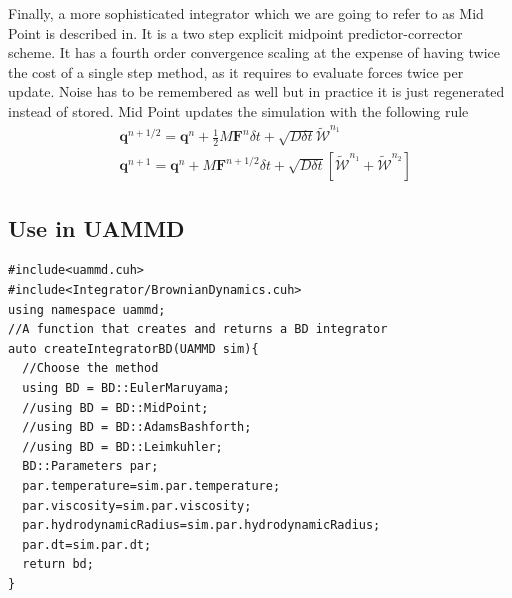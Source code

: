 \documentclass[ twoside,openright,titlepage,numbers=noenddot,%
headinclude,footinclude,cleardoublepage=empty,abstract=on,
BCOR=5mm,paper=a4,fontsize=11pt, dvipsnames
]{scrreprt}
\def\ucpp{uammd_cpp_lexer.py:UAMMDCppLexer -x}
\renewcommand{\vec}[1]{\bm{#1}}
\newcommand{\dt}{\delta t}
\newcommand{\half}{\frac{1}{2}}
\newcommand{\noise}{\widetilde{W}}
\newcommand{\ppos}{q}
\begin{document}
Finally, a more sophisticated integrator which we are going to refer to as Mid Point is described in\cite{Delong2013}. 
It is a two step explicit midpoint predictor-corrector scheme. It has a fourth order convergence scaling at the expense of having twice the cost of a single step method, as it requires to evaluate forces twice per update. Noise has to be remembered as well but in practice it is just regenerated instead of stored.
Mid Point updates the simulation with the following rule
\begin{equation}
  \begin{aligned}
    &\vec{\ppos}^{n+1/2} = \vec{\ppos}^n + \half M\vec{F}^n\dt + \sqrt{D\dt}\vec{\mathcal{\noise}}^{n_1}\\
    &\vec{\ppos}^{n+1} = \vec{\ppos}^n + M\vec{F}^{n+1/2}\dt + \sqrt{D\dt}\left[\vec{\mathcal{\noise}}^{n_1}  + \vec{\mathcal{\noise}}^{n_2}\right]
  \end{aligned}
\end{equation}
\subsection{Use in UAMMD}

\begin{verbatim}
#include<uammd.cuh>
#include<Integrator/BrownianDynamics.cuh>
using namespace uammd;
//A function that creates and returns a BD integrator
auto createIntegratorBD(UAMMD sim){   
  //Choose the method
  using BD = BD::EulerMaruyama;
  //using BD = BD::MidPoint;
  //using BD = BD::AdamsBashforth;
  //using BD = BD::Leimkuhler;
  BD::Parameters par;
  par.temperature=sim.par.temperature;
  par.viscosity=sim.par.viscosity;
  par.hydrodynamicRadius=sim.par.hydrodynamicRadius;
  par.dt=sim.par.dt;
  return bd;
}
\end{verbatim}
\end{document}
